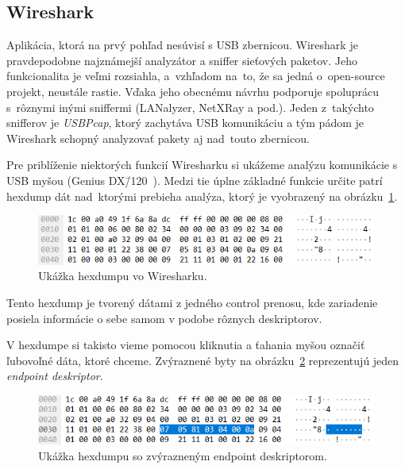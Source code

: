 \subsection*{Wireshark}

Aplikácia, ktorá na prvý pohľad nesúvisí s USB zbernicou. Wireshark je pravdepodobne najznámejší analyzátor a sniffer sieťových paketov. Jeho funkcionalita je veľmi rozsiahla, a~vzhľadom na~to, že sa jedná o~open-source projekt, neustále rastie. Vďaka jeho obecnému návrhu podporuje spoluprácu s~rôznymi inými sniffermi (LANalyzer, NetXRay a pod.). Jeden z~takýchto snifferov je \textit{USBPcap}, ktorý zachytáva USB komunikáciu a tým pádom je Wireshark schopný analyzovať pakety aj nad~touto zbernicou. 

Pre priblíženie niektorých funkcií Wiresharku si ukážeme analýzu komunikácie s USB myšou (Genius DX\=/120~\cite{genius_mouse}). Medzi tie úplne základné funkcie určite patrí hexdump dát nad~ktorými prebieha analýza, ktorý je vyobrazený na obrázku~\ref{obr:uvod:wireshark_hexdump}. 

\begin{figure}[!htb]
	\centering
	\includegraphics[width=12cm]{img/uvod_wireshark_hexdump}
	\caption{Ukážka hexdumpu vo Wiresharku.}
	\label{obr:uvod:wireshark_hexdump}
\end{figure}


Tento hexdump je tvorený dátami z jedného control prenosu, kde zariadenie posiela informácie o sebe samom v podobe rôznych deskriptorov. 

V hexdumpe si takisto vieme pomocou kliknutia a ťahania myšou označiť ľubovoľné dáta, ktoré chceme. Zvýraznené byty na obrázku~\ref{obr:uvod:wireshark_hexdump_endpoint} reprezentujú jeden \textit{endpoint deskriptor}.

\begin{figure}[!htb]
	\centering
	\includegraphics[width=12cm]{img/uvod_wireshark_hexdump_endpoint}
	\caption{Ukážka hexdumpu so zvýrazneným endpoint deskriptorom.}
	\label{obr:uvod:wireshark_hexdump_endpoint}
\end{figure}

